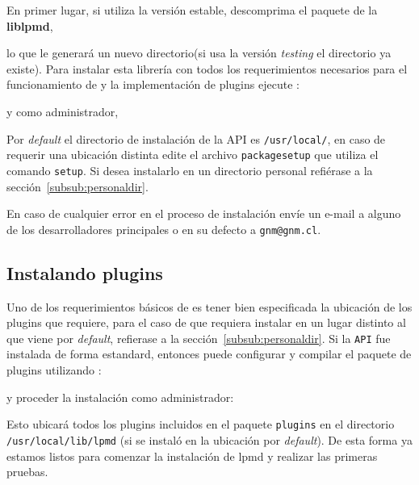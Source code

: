 En primer lugar, si utiliza la versi\'on estable, descomprima el paquete de la \textbf{liblpmd},


lo que le generar\'a un nuevo directorio(si usa la versi\'on \textit{testing} el directorio ya existe). Para instalar esta librer\'ia con todos los requerimientos necesarios para el funcionamiento de {\lpmd} y la implementaci\'on de plugins ejecute :


y como administrador,


Por \textit{default} el directorio de instalaci\'on de la API es \verb|/usr/local/|, en caso de requerir una ubicaci\'on distinta edite el archivo \verb|packagesetup| que utiliza el comando \verb|setup|. Si desea instalarlo en un directorio personal refi\'erase a la secci\'on~\ref{subsub:personaldir}.

En caso de cualquier error en el proceso de instalaci\'on env\'ie un e-mail a alguno de los desarrolladores principales o en su defecto a \verb|gnm@gnm.cl|.

\subsection{Instalando plugins}

Uno de los requerimientos b\'asicos de {\lpmd} es tener bien especificada la ubicaci\'on de los plugins que {\lpmd} requiere, para el caso de que requiera instalar {\lpmd} en un lugar distinto al que viene por \textit{default}, refierase a la secci\'on~\ref{subsub:personaldir}. Si la \verb|API| fue instalada de forma estandard, entonces puede configurar y compilar el paquete de plugins utilizando :


y proceder la instalaci\'on como administrador:


Esto ubicar\'a todos los plugins incluidos en el paquete \verb|plugins| en el directorio \verb|/usr/local/lib/lpmd| (si se instal\'o en la ubicaci\'on por \textit{default}). De esta forma ya estamos listos para comenzar la instalaci\'on de lpmd y realizar las primeras pruebas.

